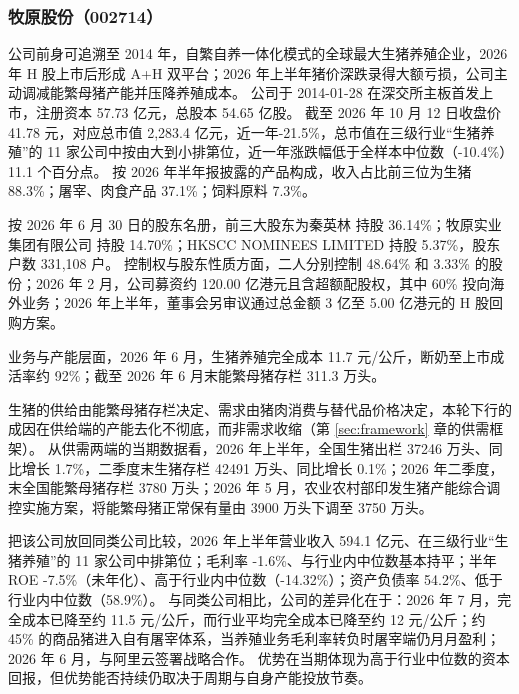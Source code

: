 
\subsubsection{牧原股份（002714）}
\label{co:002714}

 公司前身可追溯至 2014 年，自繁自养一体化模式的全球最大生猪养殖企业，2026 年 H 股上市后形成 A+H 双平台；2026 年上半年猪价深跌录得大额亏损，公司主动调减能繁母猪产能并压降养殖成本。 公司于 2014-01-28 在深交所主板首发上市，注册资本 57.73 亿元，总股本 54.65 亿股。 截至 2026 年 10 月 12 日收盘价 41.78 元，对应总市值 2,283.4 亿元，近一年-21.5\%，总市值在三级行业“生猪养殖”的 11 家公司中按由大到小排第位，近一年涨跌幅低于全样本中位数（-10.4\%）11.1 个百分点。 按 2026 年半年报披露的产品构成，收入占比前三位为生猪 88.3\%；屠宰、肉食产品 37.1\%；饲料原料 7.3\%。

 按 2026 年 6 月 30 日的股东名册，前三大股东为秦英林 持股 36.14\%；牧原实业集团有限公司 持股 14.70\%；HKSCC NOMINEES LIMITED 持股 5.37\%，股东户数 331,108 户。 控制权与股东性质方面，二人分别控制 48.64\% 和 3.33\% 的股份；2026 年 2 月，公司募资约 120.00 亿港元且含超额配股权，其中 60\% 投向海外业务；2026 年上半年，董事会另审议通过总金额 3 亿至 5.00 亿港元的 H 股回购方案。

 业务与产能层面，2026 年 6 月，生猪养殖完全成本 11.7 元/公斤，断奶至上市成活率约 92\%；截至 2026 年 6 月末能繁母猪存栏 311.3 万头。

 生猪的供给由能繁母猪存栏决定、需求由猪肉消费与替代品价格决定，本轮下行的成因在供给端的产能去化不彻底，而非需求收缩（第 \ref{sec:framework} 章的供需框架）。 从供需两端的当期数据看，2026 年上半年，全国生猪出栏 37246 万头、同比增长 1.7\%，二季度末生猪存栏 42491 万头、同比增长 0.1\%；2026 年二季度，末全国能繁母猪存栏 3780 万头；2026 年 5 月，农业农村部印发生猪产能综合调控实施方案，将能繁母猪正常保有量由 3900 万头下调至 3750 万头。

 把该公司放回同类公司比较，2026 年上半年营业收入 594.1 亿元、在三级行业“生猪养殖”的 11 家公司中排第位；毛利率 -1.6\%、与行业内中位数基本持平；半年 ROE -7.5\%（未年化）、高于行业内中位数（-14.32\%）；资产负债率 54.2\%、低于行业内中位数（58.9\%）。 与同类公司相比，公司的差异化在于：2026 年 7 月，完全成本已降至约 11.5 元/公斤，而行业平均完全成本已降至约 12 元/公斤；约 45\% 的商品猪进入自有屠宰体系，当养殖业务毛利率转负时屠宰端仍月月盈利；2026 年 6 月，与阿里云签署战略合作。 优势在当期体现为高于行业中位数的资本回报，但优势能否持续仍取决于周期与自身产能投放节奏。

